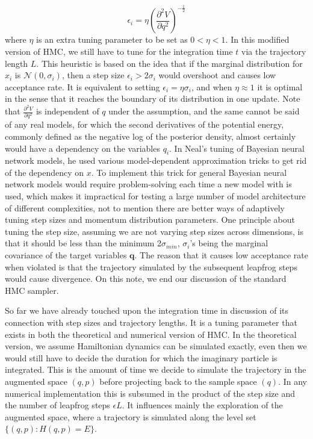 \documentclass[12pt]{report}
\begin{document}
\[ \epsilon_i  = \eta (\frac{\partial^2 V}{\partial q^2})^{-\frac{1}{2}}\]
where $\eta$ is an extra tuning parameter to be set as $0<\eta<1$. In this
modified version of HMC, we still have to tune for the integration time $t$ via
the trajectory length $L$. This heuristic is based on the idea that if the
marginal distribution for $x_i$ is $\mathcal{N}(0,\sigma_i)$, then a
step size $\epsilon_i > 2 \sigma_i$ would overshoot and causes low acceptance
rate. It is equivalent to setting $\epsilon_i = \eta \sigma_i$, and when $\eta
\approx 1$ it is optimal in the sense that it reaches the boundary of its
distribution in one update. Note that $  \frac{\partial^2 V}{\partial q^2}$ is
independent of $q$ under the assumption, and the same cannot be said of any real
models, for which the second derivatives of the potential energy, commonly
defined as the negative log of the posterior density, almost certainly would
have a dependency on the variables $q_i$. In Neal's tuning of Bayesian neural network models, he used
various model-dependent approximation tricks to get rid of the dependency on
$x$. To implement this trick for general Bayesian neural network models would require
problem-solving each time a new model with is used, which makes it impractical for
testing a large number of model architecture of different complexities, not to mention there are better ways of adaptively tuning
step sizes and momentum distribution parameters. One principle about tuning
the step size, assuming we are not varying step sizes across dimensions, is that it
should be less than the minimum 2$\sigma_{min}$, $\sigma_i$'s being the marginal
covariance of the target variables $\mathbf{q}$. The reason that it causes low
acceptance rate when violated is that the trajectory simulated by the subsequent
leapfrog steps would cause divergence. On this note, we end our discussion of the
standard HMC sampler.


So far we have already touched upon the integration time in discussion of
its connection with step sizes and trajectory lengths. It is a tuning parameter
that exists in both the theoretical and numerical version of HMC. In the
theoretical version, we assume Hamiltonian dynamics can be simulated exactly,
even then we would still have to decide the duration for which the imaginary
particle is integrated. This
is the amount of time we decide to simulate the trajectory in the augmented
space $(q,p)$ before projecting back to the sample space $(q)$. In any
numerical implementation this is subsumed in the product of the step size and the
number of leapfrog steps $\epsilon L$. It influences mainly the exploration of
the augmented space, where a trajectory is simulated along the level set
$\{(q,p):H(q,p)=E\}$.
\end{document}
